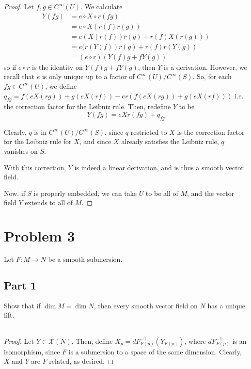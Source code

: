 \documentclass[fontsize=11pt]{scrartcl} %
\numberwithin{equation}{section} %
\numberwithin{figure}{section} %
\numberwithin{table}{section} %
\begin{document}
\begin{proof}
    Let $f,g\in
    C^{\infty}(U)$. We calculate
    \[
        \begin{aligned}
            Y(fg) &= e\circ X\circ r(fg)\\
                    &= e\circ X(r(f)r(g))\\
                    &= e(X(r(f))r(g) + r(f)X(r(g)))\\
                    &= e(r(Y(f))r(g) +r(f)r(Y(g))\\
                    &= (e\circ r)(Y(f)g + fY(g))
        \end{aligned}
    \]
    so if $e\circ r$ is the identity on $Y(f)g + fY(g)$, then $Y$ is a
    derivation. However, we recall that $e$ is only unique up to a factor of
    $C^{\infty}(U)/{C^{\infty}(S)}$. So, for each $fg\in C^{\infty}(U)$, we
    define $q_{fg} = f(eX(rg)) + g(eX(rf)) - er(f(eX(rg)) + g(eX(rf)))$ i.e. the
    correction factor for the Leibniz rule. Then, redefine $Y$ to be
    \[
        Y(fg) = eXr(fg) + q_{fg}
    \]

    Clearly, $q$ is in $C^{\infty}(U)/{C^{\infty}(S)}$, since $q$ restricted to
    $X$ is the correction factor for the Leibniz rule for $X$, and since $X$
    already satisfies the Leibniz rule, $q$ vanishes on $S$.
    
    With this correction, $Y$ is indeed a linear derivation, and is thus a
    smooth vector field.

    Now, if $S$ is properly embedded, we can take $U$ to be all of $M$, and the
    vector field $Y$ extends to all of $M$.
\end{proof}

\section*{Problem 3} %
Let $F:M\to N$ be a smooth submersion.
\subsection*{Part 1}
Show that if $\dim M = \dim N$, then every smooth vector field on $N$ has a
unique lift.
\\
\\
\begin{proof}
    Let $Y\in \mathcal{X}(N)$. Then, define $X_p = dF^{-1}_{F(p)}(Y_{F(p)})$, where
    $dF^{-1}_{F(p)}$ is an isomorphism, since $F$ is a submersion to a space of
    the same dimension. Clearly, $X$ and $Y$ are $F$-related, as desired.
\end{proof}
\end{document}
